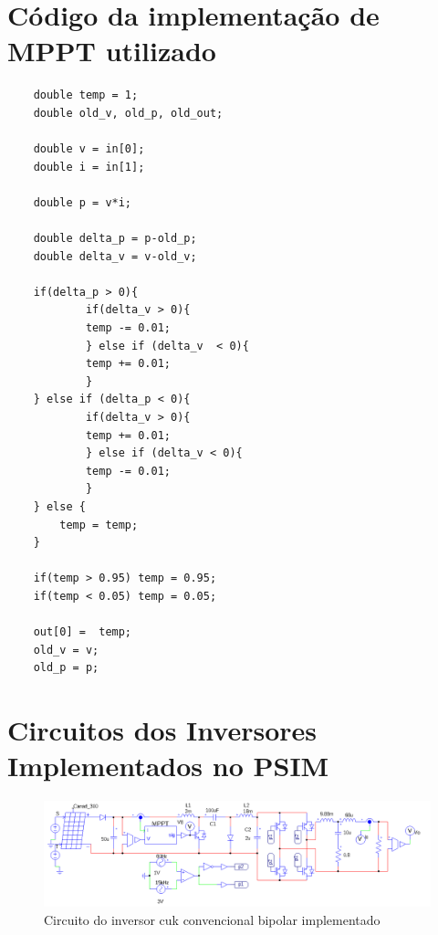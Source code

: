 \documentclass[
	12pt,				%
	openright,			%
	twoside,			%
	a4paper,			%
	english,			%
	french,				%
	spanish,			%
	brazil,				%
	]{abntex2}
\begin{document}


\begin{anexosenv}

	\partanexos
	\chapter{Código da implementação de MPPT utilizado}\label{anex:mppt_code}


	\begin{lstlisting}
	double temp = 1;
	double old_v, old_p, old_out;

	double v = in[0];
	double i = in[1];

	double p = v*i;

	double delta_p = p-old_p;
	double delta_v = v-old_v;

	if(delta_p > 0){
			if(delta_v > 0){
			temp -= 0.01; 
			} else if (delta_v  < 0){
			temp += 0.01;
			}
	} else if (delta_p < 0){
			if(delta_v > 0){
			temp += 0.01;
			} else if (delta_v < 0){
			temp -= 0.01; 
			}
	} else {
		temp = temp;
	}

	if(temp > 0.95) temp = 0.95;
	if(temp < 0.05) temp = 0.05;

	out[0] =  temp;
	old_v = v;
	old_p = p;

	\end{lstlisting}

	\chapter{Circuitos dos Inversores Implementados no PSIM} \label{anex:circ_images}

	\begin{figure}
		\centering
		\includegraphics[width=\linewidth]{comp_conv_circ_clean}
		\caption{Circuito do inversor cuk convencional bipolar implementado}	


\end{figure}
\end{anexosenv}
\end{document}
